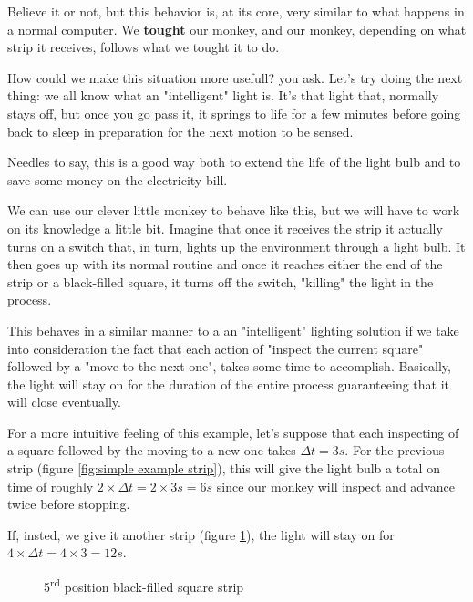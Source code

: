 \documentclass[12pt, a4paper]{book}
\begin{document}
Believe it or not, but this behavior is, at its core, very similar to what
happens in a normal computer. We \textbf{tought} our monkey, and our monkey, depending on what strip it receives, follows what we tought it to do.

How could we make this situation more usefull? you ask. Let's try doing the next thing: we all know what an "intelligent" light is. It's that light that, normally stays off, but once you go pass it, it springs to life for a few minutes before going back to sleep in preparation for the next motion to be sensed.

Needles to say, this is a good way both to extend the life of the light bulb and to save some money on the electricity bill.

We can use our clever little monkey to behave like this, but we will have to work on its knowledge a little bit. Imagine that once it receives the strip it actually turns on a switch that, in turn, lights up the environment through a light bulb. It then goes up with its normal routine and once it reaches either the end of the strip or a black-filled square, it turns off the switch, "killing" the light in the process.

This behaves in a similar manner to a an "intelligent" lighting solution if we take into consideration the fact that each action of "inspect the current square" followed by a "move to the next one", takes some time to accomplish. Basically, the light will stay on for the duration of the entire process guaranteeing that it will close eventually.

For a more intuitive feeling of this example, let's suppose that each inspecting of a square followed by the moving to a new one takes $\Delta t=3s$. For the previous strip (figure \ref{fig:simple example strip}), this will give the light bulb a total on time of roughly $2 \times \Delta t=2 \times 3s=6s$ since our monkey will inspect and advance twice before stopping. 

If, insted, we give it another strip (figure \ref{fig:second-simple example strip}), the light will stay on for $4 \times \Delta t = 4 \times 3 = 12s$.

\begin{figure}[h]
  \centering
  \caption{5\textsuperscript{rd} position black-filled square strip}  
  \label{fig:second-simple example strip}
\end{figure}
\end{document}
